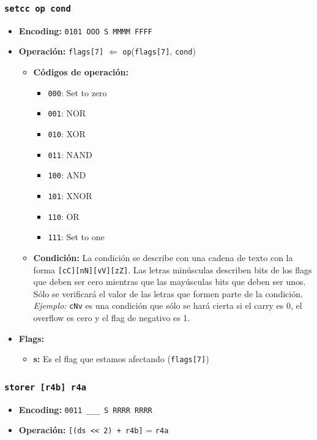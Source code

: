 \documentclass{article}
\begin{document}
\subsubsection{\texttt{setcc op cond}}
\begin{itemize}
    \item \textbf{Encoding:} \texttt{0101 OOO S MMMM FFFF}
    \item \textbf{Operación:} \texttt{flags[7]} $\Leftarrow$ \texttt{op}(\texttt{flags[7]}, \texttt{cond})
        \begin{itemize}
            \item \textbf{Códigos de operación:}
                \begin{itemize}
                    \item \texttt{000}: Set to zero
                    \item \texttt{001}: NOR
                    \item \texttt{010}: XOR
                    \item \texttt{011}: NAND
                    \item \texttt{100}: AND
                    \item \texttt{101}: XNOR
                    \item \texttt{110}: OR
                    \item \texttt{111}: Set to one
                \end{itemize}
            \item \textbf{Condición:} La condición se describe con una cadena de texto con la forma \texttt{[cC][nN][vV][zZ]}. Las letras minúsculas describen bits de los flags que deben ser cero mientras que las mayúsculas bits que deben ser unos. Sólo se verificará el valor de las letras que formen parte de la condición. 
            \\ 
            \emph{Ejemplo:} \texttt{cNv} es una condición que sólo se hará cierta si el carry es 0, el overflow es cero y el flag de
            negativo es 1.
        \end{itemize}
        \item \textbf{Flags:}
        \begin{itemize}
            \item \textbf{s:} Es el flag que estamos afectando (\texttt{flags[7]})
        \end{itemize}
  \end{itemize}
      
\subsubsection{\texttt{storer [r4b] r4a}}
\begin{itemize}
    \item \textbf{Encoding:} \texttt{0011 \_\_\_ S RRRR RRRR}
    \item \textbf{Operación:} \texttt{[(ds << 2) + r4b]} = \texttt{r4a}
\end{itemize}
\end{document}

